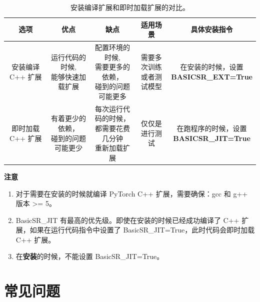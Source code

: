 \documentclass[../main.tex]{subfiles}
\begin{document}
\begin{table}[h]
\centering
\footnotesize
\begin{tabular}{|c|c|c|c|c|}
  \hline
  选项                     & 优点                  & 缺点                            & 适用场景         & 具体安装指令 \\
  \hline
  安装编译 C++ 扩展 & \makecell[c]{运行代码的时候, \\ 能够快速加载扩展} & \makecell*[c]{配置环境的时候, \\ 需要更多的依赖，\\碰到的问题可能更多} & \makecell[c]{需要多次训练 \\ 或者测试模型} & \makecell[c]{在安装的时候，设置 \\\textbf{BASICSR\_EXT=True}}\\
  \hline
  即时加载 C++ 扩展 & \makecell[c]{有着更少的依赖，\\碰到的问题可能更少} & \makecell[c]{每次运行代码的时候，\\都需要花费几分钟\\重新加载扩展} & 仅仅是进行测试 & \makecell[c]{在跑程序的时候，设置 \\\textbf{BASICSR\_JIT=True}} \\
  \hline
\end{tabular}
\caption{\label{tab:env}安装编译扩展和即时加载扩展的对比。}
\end{table}


\begin{note} %
    \textbf{注意}
	\begin{enumerate}
	    \item 对于需要在安装的时候就编译 PyTorch C++ 扩展，需要确保：gcc 和 g++ 版本 >= 5。
	    \item BasicSR\_JIT 有最高的优先级。即使在安装的时候已经成功编译了 C++ 扩展，如果在运行代码指令中设置了 BasicSR\_JIT=True，此时代码会即时加载 C++ 扩展。
	    \item 在\textbf{安装}的时候，不能设置 BasicSR\_JIT=True。
	\end{enumerate}
\end{note}




\section{常见问题}
\label{section:question}
\end{document}

